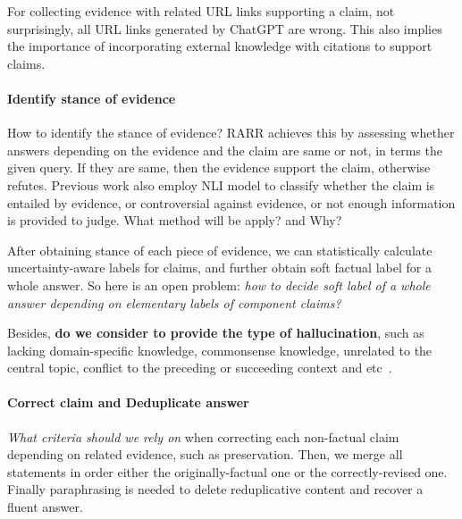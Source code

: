 \documentclass[11pt]{article}
\begin{document}
For collecting evidence with related URL links supporting a claim, not surprisingly, all URL links generated by ChatGPT are wrong.
This also implies the importance of incorporating external knowledge with citations to support claims.


\paragraph{Identify stance of evidence}
How to identify the stance of evidence? 
RARR achieves this by assessing whether answers depending on the evidence and the claim are same or not, in terms the given query. 
If they are same, then the evidence support the claim, otherwise refutes.
Previous work also employ NLI model to classify whether the claim is entailed by evidence, or controversial against evidence, or not enough information is provided to judge.
What method will be apply? and Why?

After obtaining stance of each piece of evidence, we can statistically calculate uncertainty-aware labels for claims, and further obtain soft factual label for a whole answer.
So here is an open problem: \textit{how to decide soft label of a whole answer depending on elementary labels of component claims?}

Besides, \textbf{do we consider to provide the type of hallucination}, such as lacking domain-specific knowledge, commonsense knowledge, unrelated to the central topic, conflict to the preceding or succeeding context and etc~\citep{liu-etal-2022-token}.


\paragraph{Correct claim and Deduplicate answer}
\textit{What criteria should we rely on} when correcting each non-factual claim depending on related evidence, such as preservation. 
Then, we merge all statements in order either the originally-factual one or the correctly-revised one. 
Finally paraphrasing is needed to delete reduplicative content and recover a fluent answer.


\end{document}

